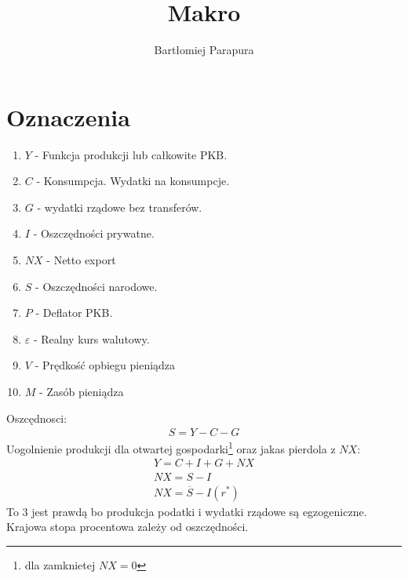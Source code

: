 \documentclass{article}
\title{Makro}
\author{Bartłomiej Parapura}
\begin{document}
\maketitle
\section{Oznaczenia}
\begin{enumerate}
    \item \(Y\) - Funkcja produkcji lub całkowite PKB.
    \item \(C\) - Konsumpcja. Wydatki na konsumpcje.
    \item \(G\) - wydatki rządowe bez transferów.
    \item \(I\) - Oszczędności prywatne.
    \item \(NX\) - Netto export
    \item \(S\) - Oszczędności narodowe.
    \item \(P\) - Deflator PKB.
    \item \(\varepsilon\) - Realny kurs walutowy.
    \item \(V\) - Prędkość opbiegu pieniądza
    \item \(M\) - Zasób pieniądza
\end{enumerate}
Oszcędnosci:
\begin{gather}
    S = Y - C - G
\end{gather}
Uogolnienie produkcji dla otwartej gospodarki\footnote{dla zamknietej \(NX = 0\)} oraz jakas pierdola z \(NX\):
\begin{gather}
    Y = C + I + G + NX\\
    NX = S - I\\
    NX = \overline{S} - I(r^*)
\end{gather}
To 3 jest prawdą bo produkcja podatki i wydatki rządowe są egzogeniczne. 
Krajowa stopa procentowa zależy od oszczędności.
\end{document}
